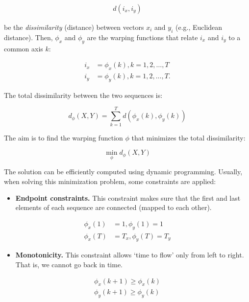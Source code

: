 \documentclass[
  11pt,
]{krantz}
\providecommand{\tightlist}{%
  \setlength{\itemsep}{0pt}\setlength{\parskip}{0pt}}
\begin{document}
\begin{align*}
d(i_x,i_y)
\end{align*}

be the \emph{dissimilarity} (distance) between vectors \(x_i\) and \(y_i\) (e.g., Euclidean distance). Then, \(\phi_x\) and \(\phi_y\) are the warping functions that relate \(i_x\) and \(i_y\) to a common axis \(k\):

\begin{align*}
i_x&=\phi_x (k), k=1,2,\dots,T \\
i_y&=\phi_y (k), k=1,2,\dots,T.
\end{align*}

The total dissimilarity between the two sequences is:

\begin{equation}
  d_\phi (X,Y) = \sum_{k=1}^T{d\left(\phi_x (k), \phi_y (k)\right)}
  \label{eq:dtwDissimilarity}
\end{equation}

The aim is to find the warping function \(\phi\) that minimizes the total dissimilarity:

\begin{equation}
  \operatorname*{min}_{\phi} d_\phi (X,Y)
  \label{eq:dtwmin}
\end{equation}

The solution can be efficiently computed using dynamic programming. Usually, when solving this minimization problem, some constraints are applied:

\begin{itemize}
\tightlist
\item
  \textbf{Endpoint constraints.} This constraint makes sure that the first and last elements of each sequence are connected (mapped to each other).
\end{itemize}

\begin{align*}
\phi_x (1)&=1, \phi_y (1)=1 \\
\phi_x (T)&=T_x, \phi_y (T)=T_y
\end{align*}

\begin{itemize}
\tightlist
\item
  \textbf{Monotonicity.} This constraint allows `time to flow' only from left to right. That is, we cannot go back in time.
\end{itemize}

\begin{align*}
\phi_x (k+1) \geq \phi_x(k) \\
\phi_y (k+1) \geq \phi_y(k)
\end{align*}
\end{document}
